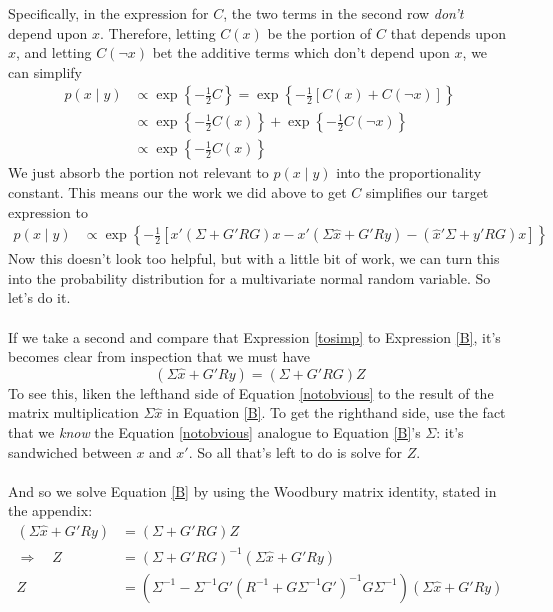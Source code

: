 \documentclass[a4paper,12pt]{scrartcl}
\begin{document}
Specifically, in the expression for $C$, the two terms
in the second row \emph{don't} depend upon $x$. Therefore,
letting $C(x)$ be the portion of $C$ that depends upon
$x$, and letting $C(\lnot x)$ bet the additive terms which
don't depend upon $x$, we can simplify
\begin{align*}
    p(x\; | \; y) &\propto \exp\left\{ -\frac{1}{2}
	C \right\} = \exp\left\{ -\frac{1}{2}
	\left[C(x) + C(\lnot x) \right]\right\}  \\
    &\propto \exp\left\{ -\frac{1}{2}
	C(x)\right\} +  \exp\left\{ -\frac{1}{2} C(\lnot x) 
	\right\}  \\
    &\propto \exp\left\{ -\frac{1}{2}
	C(x)\right\}
\end{align*}
We just absorb the portion not relevant to $p(x\;|\;y)$ into
the proportionality constant.  This means our the work we
did above to get $C$ simplifies our target expression to
\begin{align}
    p(x\;|\;y) &\propto \exp\left\{-\frac{1}{2} \left[
	x' \left( \Sigma + G'RG\right) x 
	- x' (\Sigma \hat{x} + G'Ry)
	- (\hat{x}' \Sigma + y' RG) x  \right]\right\}
	\label{tosimp}
\end{align}
Now this doesn't look too helpful, but with a little bit of 
work, we can turn this into the probability distribution
for a multivariate normal random variable. So let's do it.
\\
\\
If we  take a second and compare that Expression \ref{tosimp}
to Expression \ref{B}, it's becomes clear from inspection 
that we must have 
\begin{equation}
    \label{notobvious}
    (\Sigma \hat{x} + G'Ry) = \left( \Sigma + G'RG\right) Z
\end{equation}
To see this, 
liken the lefthand side of Equation \ref{notobvious} to
the result of the matrix multiplication $\Sigma \hat{x}$ in
Equation \ref{B}. To get the righthand side, use the fact
that we \emph{know} the Equation \ref{notobvious} analogue
to Equation \ref{B}'s $\Sigma$: it's sandwiched between 
$x$ and $x'$.  So all that's left to do is solve for $Z$.
\\
\\
And so we solve Equation \ref{B} by using the Woodbury matrix
identity, stated in the appendix:
\begin{align*}
    (\Sigma \hat{x} + G'Ry) &= \left( \Sigma + G'RG\right) Z \\
    \Rightarrow \quad Z &=
	\left( \Sigma + G'RG\right)^{-1} 
	(\Sigma \hat{x} + G'Ry) \\
    Z &= 
	\left( \Sigma^{-1} - \Sigma^{-1} G'(R^{-1} 
	+ G\Sigma^{-1}G')^{-1}
	G\Sigma^{-1}\right) \left(\Sigma \hat{x} + G'Ry\right)
\end{align*}
\end{document}
